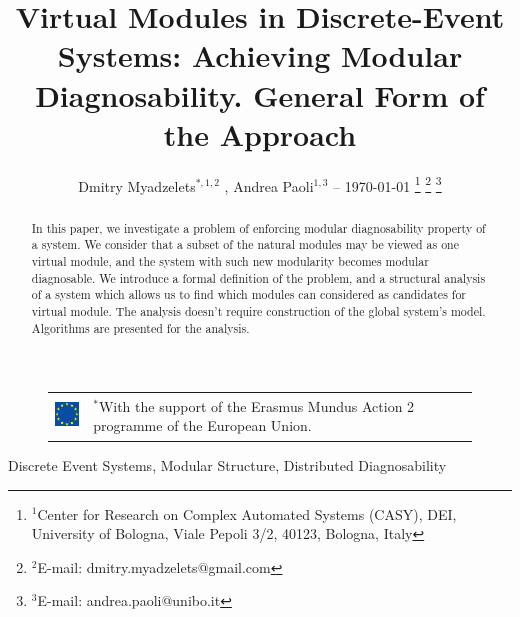 \documentclass[a4paper, 10pt, conference]{ieeeconf}
\begin{document}
\title{Virtual Modules in Discrete-Event Systems: 
Achieving Modular Diagnosability. General Form of the Approach}
\author{
	Dmitry Myadzelets$^{*,1,2}$
	, Andrea Paoli$^{1,3}$
	-- \today
	\thanks{$^{1}$Center for Research on Complex Automated Systems (CASY), DEI,
	University of Bologna, Viale Pepoli 3/2, 40123, Bologna, Italy}
		\thanks{$^{2}$E-mail: {dmitry.myadzelets@gmail.com}}
		\thanks{$^{3}$E-mail: {andrea.paoli@unibo.it}}
}
\maketitle

\begin{figure}[!b]
\begin{tabular}{l p{60mm}}
 	\includegraphics[height=10mm]{EU_flag.eps}
 	& \vspace{-10mm} \footnotesize
 	$^{*}$With the support of the Erasmus Mundus Action 2 programme of the
 	European Union.
\end{tabular}
\end{figure}

\begin{abstract} In this paper, we investigate a problem of enforcing modular
diagnosability property of a system. We consider that a subset of the natural
modules may be viewed as one virtual module, and the system with such new
modularity becomes modular diagnosable. We introduce a formal definition of the
problem, and a structural analysis of a system which allows us to find which
modules can considered as candidates for virtual module. The analysis doesn't
require construction of the global system's model. Algorithms are presented
for the analysis.
\end{abstract}

\begin{keywords}
Discrete Event Systems, Modular Structure, Distributed Diagnosability
\end{keywords}

\newtheorem{theorem}{Theorem}
\newtheorem{definition}{Definition}
\newtheorem{lemma}{Lemma}
\newtheorem{assumption}{Assumption}
\newtheorem{corollary}{Corollary}
\newtheorem{example}{Example}
\newtheorem{algorithm}{Algorithm}
\end{document}
